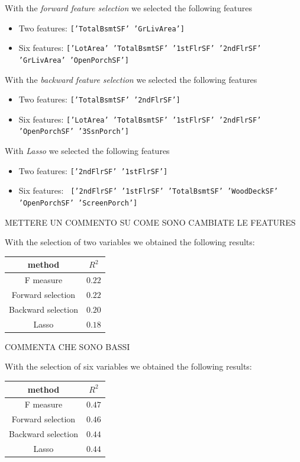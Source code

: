 \documentclass[a4paper,oneside,12pt]{article}
\begin{document}
With the \textit{forward feature selection} we selected the following features 

\begin{itemize}
\item Two features: \texttt{['TotalBsmtSF' 'GrLivArea']} 
\item Six features:  \texttt{['LotArea' 'TotalBsmtSF' '1stFlrSF' '2ndFlrSF' 'GrLivArea' 'OpenPorchSF']}
\end{itemize}

With the \textit{backward feature selection} we selected the following features 

\begin{itemize}
\item Two features: \texttt{['TotalBsmtSF' '2ndFlrSF']} 
\item Six features:  \texttt{['LotArea' 'TotalBsmtSF' '1stFlrSF' '2ndFlrSF' 'OpenPorchSF' '3SsnPorch']}
\end{itemize}

With \textit{Lasso} we selected the following features 

\begin{itemize}
\item Two features: \texttt{['2ndFlrSF' '1stFlrSF']} 
\item Six features:  \texttt{ ['2ndFlrSF' '1stFlrSF' 'TotalBsmtSF' 'WoodDeckSF' 'OpenPorchSF' 'ScreenPorch']}
\end{itemize}

METTERE UN COMMENTO SU COME SONO CAMBIATE LE FEATURES

With the selection of two variables we obtained the following results:

\begin{table}[H]
\centering
\begin{tabular}{|c|c|}
\hline
method & $R^2$ \\
\hline
F measure  & $0.22$ \\
\hline
Forward selection  & $0.22$ \\
\hline
Backward selection  & $0.20$ \\
\hline
Lasso  & $0.18$ \\
\hline
\end{tabular}
\end{table}

COMMENTA CHE SONO BASSI

With the selection of six variables we obtained the following results:

\begin{table}[H]
\centering
\begin{tabular}{|c|c|}
\hline
method & $R^2$ \\
\hline
F measure  & $0.47$ \\
\hline
Forward selection  & $0.46$ \\
\hline
Backward selection  & $0.44$ \\
\hline
Lasso  & $0.44$ \\
\hline
\end{tabular}
\end{table}
\end{document}
